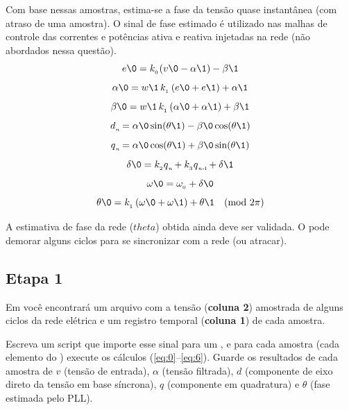 Com base nessas amostras, estima-se a fase da tensão quase instantânea (com atraso de uma amostra).
O sinal de fase estimado é utilizado nas malhas de controle das correntes e potências ativa e reativa injetadas na rede
(não abordados nessa questão).
\begin{equation}\label{eq:0}
        e\0 = k_{_0\!} \left( v\0 - \alpha\1 \right)  - \beta\1
\end{equation}
\begin{equation}\label{eq:1}
    \alpha\0 = w\1  \, k_{_1}  \left( e\0 + e\1 \right)  + \alpha\1
\end{equation}
\begin{equation}\label{eq:2}
    \beta\0 = w\1  \, k_{_1}  \left( \alpha\0 + \alpha\1 \right)  + \beta\1
\end{equation}
\begin{equation}\label{eq:3a}
    d{_{_{ n\!}}} =  \alpha\0 \sin(\theta\1) - \beta\0  \cos(\theta\1)
\end{equation}
\begin{equation}\label{eq:3b}
    q{_{_{ n\!}}} =  \alpha\0 \cos(\theta\1) + \beta\0  \sin(\theta\1)
\end{equation}
\begin{equation}\label{eq:4}
    \delta\0 = k_{_2} q{_{_{ n\!}}} + k_{_3} q{_{_{ n\text{-}\!\>\!1\!}}} + \delta\1
\end{equation}
\begin{equation}\label{eq:5}
    \omega\0  = \omega_{_0} + \delta\0
\end{equation}
\begin{equation}\label{eq:6}
    \theta\0 = k_{_1}  \left( \omega\0 + \omega\1 \right)  + \theta\1    \ \ \  (\text{mod}~2\pi)
\end{equation}

A estimativa de fase da rede ($theta$) obtida ainda deve ser validada.
O  pode demorar alguns ciclos para se sincronizar com a rede (ou atracar).


\subsection*{Etapa 1}
Em  você encontrará um
arquivo  com a
tensão (\textbf{coluna 2}) amostrada de alguns ciclos da rede elétrica e um registro temporal (\textbf{coluna 1}) de cada amostra.

Escreva um script que importe esse sinal para um , e para cada amostra (cada elemento do )
execute os cálculos (\ref{eq:0}--\ref{eq:6}).
Guarde os resultados de cada amostra de $v$ (tensão de entrada), $\alpha$ (tensão filtrada), $d$ (componente de eixo
direto da tensão em base síncrona), $q$ (componente em quadratura) e $\theta$ (fase estimada pelo PLL).

